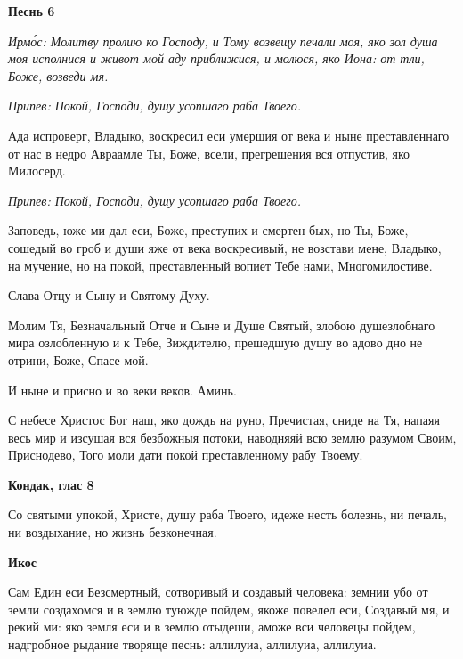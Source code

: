  

\bfseries Песнь 6\normalfont{}


 \itshape Ирмо́с:\normalfont{} Молитву пролию ко Господу, и Тому возвещу печали моя, яко зол душа
моя исполнися и живот мой аду приближися, и молюся, яко Иона: от тли, Боже,
возведи мя.


 \itshape Припев:\normalfont{} Покой, Господи, душу усопшаго раба Твоего.


   Ада испроверг, Владыко, воскресил еси умершия от века и ныне
преставленнаго от нас в недро Авраамле Ты, Боже, всели, прегрешения вся
отпустив, яко Милосерд.


 \itshape Припев:\normalfont{} Покой, Господи, душу усопшаго раба Твоего.


   Заповедь, юже ми дал еси, Боже, преступих и смертен бых, но Ты, Боже,
сошедый во гроб и души яже от века воскресивый, не возстави мене,
Владыко, на мучение, но на покой, преставленный вопиет Тебе нами,
Многомилостиве.



   Слава Отцу и Сыну и Святому Духу.


   Молим Тя, Безначальный Отче и Сыне и Душе Святый, злобою
душезлобнаго мира озлобленную и к Тебе, Зиждителю, прешедшую душу во
адово дно не отрини, Боже, Спасе мой.


   И ныне и присно и во веки веков. Аминь.


   С небесе Христос Бог наш, яко дождь на руно, Пречистая, сниде на Тя,
напаяя весь мир и изсушая вся безбожныя потоки, наводняяй всю землю
разумом Своим, Приснодево, Того моли дати покой преставленному рабу
Твоему.



 

\bfseries Кондак, глас 8\normalfont{}


   Со святыми упокой, Христе, душу раба Твоего, идеже несть болезнь, ни
печаль, ни воздыхание, но жизнь безконечная.



 

\bfseries Икос\normalfont{}


   Сам Един еси Безсмертный, сотворивый и создавый человека: земнии убо
от земли создахомся и в землю туюжде пойдем, якоже повелел еси,
Создавый мя, и рекий ми: яко земля еси и в землю отыдеши, аможе вси
человецы пойдем, надгробное рыдание творяще песнь: аллилуиа, аллилуиа,
аллилуиа.



 

